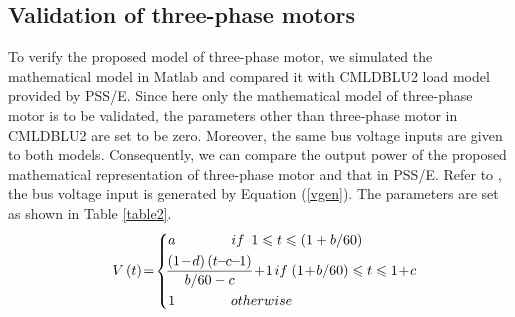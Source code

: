 \documentclass[journal]{IEEEtran}
\begin{document}
	\subsection{Validation of three-phase motors}
	To verify the proposed model of three-phase motor, we simulated the mathematical model in Matlab and compared it with CMLDBLU2 load model provided by PSS/E. Since here only the mathematical model of three-phase motor is to be validated, the parameters other than three-phase motor in CMLDBLU2 are set to be zero. Moreover, the same bus voltage inputs are given to both models. Consequently, we can compare the output power of the proposed mathematical representation of three-phase motor and that in PSS/E. Refer to \cite{EPRI2019}, the bus voltage input is generated by Equation (\ref{vgen}). The parameters are set as shown in Table \ref{table2}.
	\begin{eqnarray}\label{vgen}
	V\left( t\right) \! =\! \left\{\! \begin{aligned}
	&a{\kern 40pt} if {\kern 5pt} 1\leqslant t\leqslant\left( 1+b/60\right) \!\!\!\!\!\\\!\!\!\!\!\!
	&\!\frac{\left( 1\!-\!d\right) \left(t\!\!-\!\!c\!\!-\!\!1\right)}{b/60-c}\!+\!1 \!{\kern 3pt} if  {\kern 1pt} \left(1\!+\!b/60\right) \leqslant t\leqslant 1\!+\!c\!\!\!\!\!\\\!\!\!\!\!
	&1{\kern 40pt} otherwise
	\end{aligned} \right.
	\end{eqnarray}
	\renewcommand\arraystretch{1.2}
\end{document}
